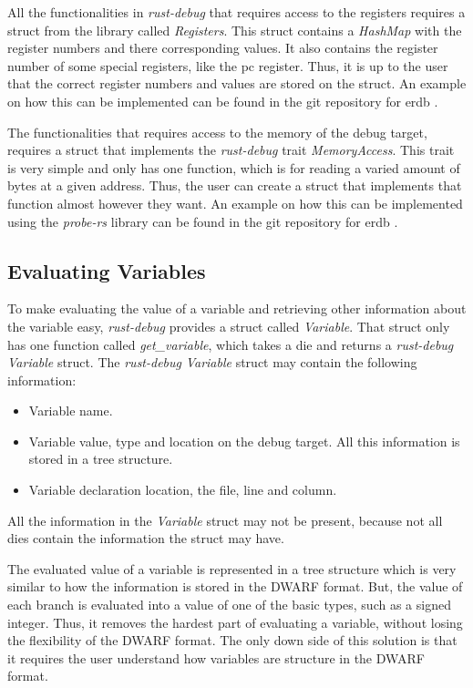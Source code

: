 All the functionalities in \emph{rust-debug} that requires access to the registers requires a struct from the library called \emph{Registers}.
This struct contains a \emph{HashMap} with the register numbers and there corresponding values.
It also contains the register number of some special registers, like the \acrshort{pc} register.
Thus, it is up to the user that the correct register numbers and values are stored on the struct.  
An example on how this can be implemented can be found in the git repository for \gls{erdb} \cite{erdb}.


The functionalities that requires access to the memory of the debug target, requires a struct that implements the \emph{rust-debug} trait \emph{MemoryAccess}.
This trait is very simple and only has one function, which is for reading a varied amount of bytes at a given address.
Thus, the user can create a struct that implements that function almost however they want.
An example on how this can be implemented using the \emph{probe-rs} library can be found in the git repository for \gls{erdb} \cite{erdb}.



\subsection{Evaluating Variables} \label{sec:ievalvar}
To make evaluating the value of a variable and retrieving other information about the variable easy, \emph{rust-debug} provides a struct called \emph{Variable}.
That struct only has one function called \emph{get\_variable}, which takes a \gls{die} and returns a \emph{rust-debug} \emph{Variable} struct.
The \emph{rust-debug} \emph{Variable} struct may contain the following information:


\begin{itemize}
  \item Variable name.
  \item Variable value, type and location on the debug target. All this information is stored in a tree structure.
  \item Variable declaration location, the file, line and column.
\end{itemize}


All the information in the \emph{Variable} struct may not be present, because not all \glspl{die} contain the information the struct may have.


The evaluated value of a variable is represented in a tree structure which is very similar to how the information is stored in the \gls{DWARF} format.
But, the value of each branch is evaluated into a value of one of the basic types, such as a signed integer.
Thus, it removes the hardest part of evaluating a variable, without losing the flexibility of the \gls{DWARF} format.
The only down side of this solution is that it requires the user understand how variables are structure in the \gls{DWARF} format.


